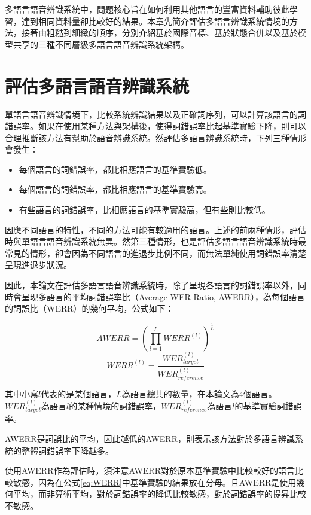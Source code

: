 多語言語音辨識系統中，問題核心旨在如何利用其他語言的豐富資料輔助彼此學習，達到相同資料量卻比較好的結果。本章先簡介評估多語言辨識系統情境的方法，接著由粗糙到細緻的順序，分別介紹基於國際音標、基於狀態合併以及基於模型共享的三種不同層級多語言語音辨識系統架構。

\section{評估多語言語音辨識系統}
單語言語音辨識情境下，比較系統辨識結果以及正確詞序列，可以計算該語言的詞錯誤率。如果在使用某種方法與架構後，使得詞錯誤率比起基準實驗下降，則可以合理推斷該方法有幫助於語音辨識系統。然評估多語言辨識系統時，下列三種情形會發生：
\begin{itemize}
 \itemsep -2pt
 \item 每個語言的詞錯誤率，都比相應語言的基準實驗低。
 \item 每個語言的詞錯誤率，都比相應語言的基準實驗高。
 \item 有些語言的詞錯誤率，比相應語言的基準實驗高，但有些則比較低。
\end{itemize}
因應不同語言的特性，不同的方法可能有較適用的語言。上述的前兩種情形，評估時與單語言語音辨識系統無異。然第三種情形，也是評估多語言語音辨識系統時最常見的情形，卻會因為不同語言的進退步比例不同，而無法單純使用詞錯誤率清楚呈現進退步狀況。

因此，本論文在評估多語言語音辨識系統時，除了呈現各語言的詞錯誤率以外，同時會呈現多語言的平均詞錯誤率比（Average WER Ratio, AWERR），為每個語言的詞誤比（WERR）的幾何平均，公式如下：

\begin{equation}\label{eq:AWERR}
AWERR = ( \prod_{l=1}^{L} {WERR^{(l)}} )^{\frac{1}{L}}
\end{equation}
\begin{equation}\label{eq:WERR}
WERR^{(l)} = \frac{WER_{target}^{(l)}}{WER_{reference}^{(l)}}
\end{equation}

其中小寫$l$代表的是某個語言，$L$為語言總共的數量，在本論文為4個語言。$WER_{target}^{(l)}$為語言$l$的某種情境的詞錯誤率，$WER_{reference}^{(l)}$為語言$l$的基準實驗詞錯誤率。

AWERR是詞誤比的平均，因此越低的AWERR，則表示該方法對於多語言辨識系統的整體詞錯誤率下降越多。

使用AWERR作為評估時，須注意AWERR對於原本基準實驗中比較較好的語言比較敏感，因為在公式\ref{eq:WERR}中基準實驗的結果放在分母。且AWERR是使用幾何平均，而非算術平均，對於詞錯誤率的降低比較敏感，對於詞錯誤率的提昇比較不敏感。

